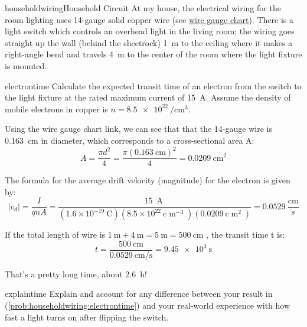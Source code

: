 \begin{mainquestion}{householdwiring}{Household Circuit}
At my house, the electrical wiring for the room lighting uses 14-gauge solid copper wire (see \href{https://www.engineeringtoolbox.com/awg-wire-gauge-d_731.html}{wire gauge chart}). There is a light switch which controls an overhead light in the living room; the wiring goes straight up the wall (behind the sheetrock) \qty{1}{\meter} to the ceiling where it makes a right-angle bend and travels \qty{4}{\meter} to the center of the room where the light fixture is mounted.

\begin{partquestion}{electrontime}
{Calculate the expected transit time of an electron from the switch to the light fixture at the rated maximum current of \qty{15}{\ampere}. Assume the density of mobile electrons in copper is $n = \qty{8.5e22}{\per\centi\meter\cubed}$.}

\begin{answer}
Using the wire gauge chart link, we can see that that the 14-gauge wire is \qty{0.163}{\centi\meter} in diameter, which corresponds to a cross-sectional area A: 
\[
A = \frac{\pi d^2}{4}
  = \frac{\pi (\qty{0.163}{\centi\meter})^2}{4}
  = \qty{0.0209}{\centi\meter\squared}
\]

The formula for the average drift velocity (magnitude) for the electron is given by:
\[
\left|v_d\right|=\frac{I}{qnA}=\frac{15\mathrm{\ \operatorname{A}} }{\left(1.6\times10^{-19}\mathrm{\ C} \right)\left(8.5\times10^{22}\mathrm{\ c} \mathrm{\operatorname{m}}^{-3}\right)\left(0.0209\mathrm{\ c}\mathrm{\operatorname{m}}^2\right)}=0.0529\ \frac{\mathrm{cm} }{s}
\]

If the total length of wire is $\qty{1}{\meter} + \qty{4}{\meter} = \qty{5}{\meter} = \qty{500}{\centi\meter}$ , the transit time t is:
\[
t = \frac{\qty{500}{\centi\meter}}{\qty{0.0529}{\centi\meter\per\second}}
  = \qty{9.45e3}{\second}
\]

That's a pretty long time, about \qty{2.6}{\hour}!
\end{answer}
\end{partquestion}

\begin{partquestion}{explaintime}
{Explain and account for any difference between your result in (\cref{prob:householdwiring:electrontime}) and your real-world experience with how fast a light turns on after flipping the switch.}


\end{partquestion}
\end{mainquestion}
